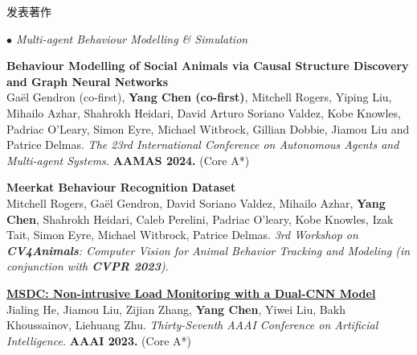 \documentclass{resume} %
\begin{document}
\begin{rSection}{发表著作}
\begin{rSubsection}{\large\em $\bullet$ Multi-agent Behaviour Modelling \& Simulation}{}{}{}
	\item {\bf Behaviour Modelling of Social Animals via Causal Structure Discovery and Graph Neural Networks}\\
		Ga\"el Gendron (co-first), \textbf{Yang Chen (co-first)}, Mitchell Rogers, Yiping Liu, Mihailo Azhar, Shahrokh Heidari, David Arturo Soriano Valdez, Kobe Knowles, Padriac O'Leary, Simon Eyre, Michael Witbrock, Gillian Dobbie, Jiamou Liu and Patrice Delmas. {\em  The 23rd International Conference on Autonomous Agents and Multi-agent Systems.} \textbf{AAMAS 2024.} (Core A*)\\
	\item {\bf Meerkat Behaviour Recognition Dataset}\\Mitchell Rogers, Gaël Gendron, David Soriano Valdez, Mihailo Azhar, \textbf{Yang Chen}, Shahrokh Heidari, Caleb Perelini, Padriac O'leary, Kobe Knowles, Izak Tait, Simon Eyre, Michael Witbrock, Patrice Delmas. {\em 3rd Workshop on {\bf CV4Animals}: Computer Vision for Animal Behavior Tracking and Modeling (in conjunction with {\bf CVPR 2023})}.\\
	\item {
	\href{}{\bf MSDC: Non-intrusive Load Monitoring with a Dual-CNN Model}}\\
		Jialing He, Jiamou Liu, Zijian Zhang, \textbf{Yang Chen}, Yiwei Liu, Bakh Khoussainov, Liehuang Zhu. {\em Thirty-Seventh AAAI Conference on Artificial Intelligence.} \textbf{AAAI 2023.} (Core A*)\\
\end{rSubsection}


\end{rSection}
\end{document}
